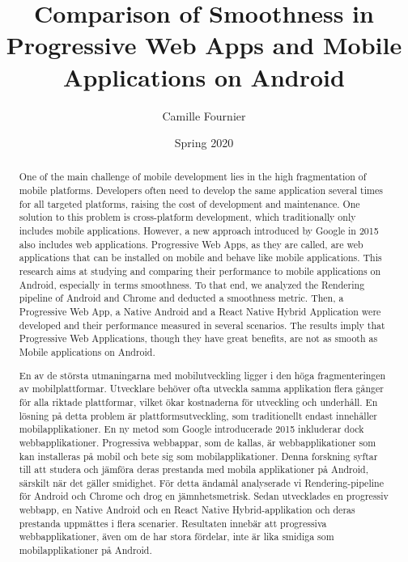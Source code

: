 \documentclass{kththesis}
\title{Comparison of Smoothness in Progressive Web Apps and Mobile Applications on Android}
\author{Camille Fournier}
\date{Spring 2020}
\begin{document}
\sloppy %


\frontmatter

\titlepage

\begin{abstract}    
  One of the main challenge of mobile development lies in the high fragmentation of mobile platforms. Developers often need to develop the same application several times for all targeted platforms, raising the cost of development and maintenance. One solution to this problem is cross-platform development, which traditionally only includes mobile applications. However, a new approach introduced by Google in 2015 also includes web applications. Progressive Web Apps, as they are called, are web applications that can be installed on mobile and behave like mobile applications. This research aims at studying and comparing their performance to mobile applications on Android, especially in terms smoothness. To that end, we analyzed the Rendering pipeline of Android and Chrome and deducted a smoothness metric. Then, a Progressive Web App, a Native Android and a React Native Hybrid Application were developed and their performance measured in several scenarios. The results imply that Progressive Web Applications, though they have great benefits, are not as smooth as Mobile applications on Android.
\end{abstract}


\begin{otherlanguage}{swedish}
  \begin{abstract}
    En av de största utmaningarna med mobilutveckling ligger i den höga fragmenteringen av mobilplattformar. Utvecklare behöver ofta utveckla samma applikation flera gånger för alla riktade plattformar, vilket ökar kostnaderna för utveckling och underhåll. En lösning på detta problem är plattformsutveckling, som traditionellt endast innehåller mobilapplikationer. En ny metod som Google introducerade 2015 inkluderar dock webbapplikationer. Progressiva webbappar, som de kallas, är webbapplikationer som kan installeras på mobil och bete sig som mobilapplikationer. Denna forskning syftar till att studera och jämföra deras prestanda med mobila applikationer på Android, särskilt när det gäller smidighet. För detta ändamål analyserade vi Rendering-pipeline för Android och Chrome och drog en jämnhetsmetrisk. Sedan utvecklades en progressiv webbapp, en Native Android och en React Native Hybrid-applikation och deras prestanda uppmättes i flera scenarier. Resultaten innebär att progressiva webbapplikationer, även om de har stora fördelar, inte är lika smidiga som mobilapplikationer på Android.
  \end{abstract}
\end{otherlanguage}
\end{document}
